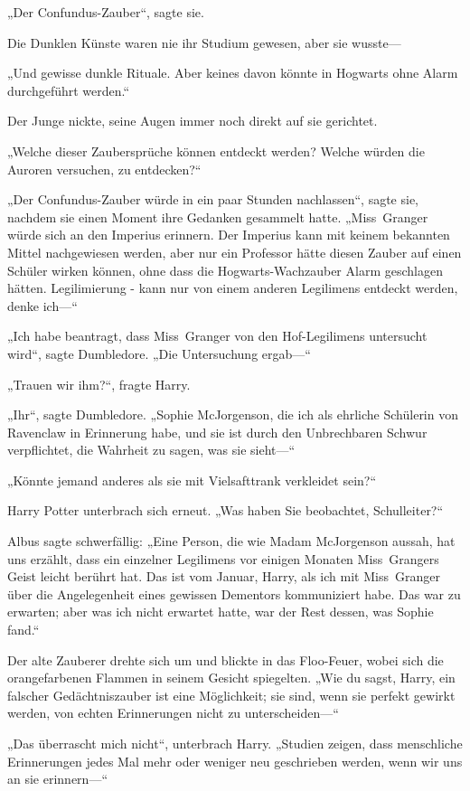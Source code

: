 {„Der Confundus-Zauber“, sagte sie.

Die Dunklen Künste waren nie ihr Studium gewesen, aber sie wusste—

„Und gewisse dunkle Rituale. Aber keines davon könnte in Hogwarts ohne Alarm durchgeführt werden.“

Der Junge nickte, seine Augen immer noch direkt auf sie gerichtet.

„Welche dieser Zaubersprüche können entdeckt werden? Welche würden die Auroren versuchen, zu entdecken?“

„Der Confundus-Zauber würde in ein paar Stunden nachlassen“, sagte sie, nachdem sie einen Moment ihre Gedanken gesammelt hatte. „Miss~Granger würde sich an den Imperius erinnern. Der Imperius kann mit keinem bekannten Mittel nachgewiesen werden, aber nur ein Professor hätte diesen Zauber auf einen Schüler wirken können, ohne dass die Hogwarts-Wachzauber Alarm geschlagen hätten. Legilimierung - kann nur von einem anderen Legilimens entdeckt werden, denke ich—“

„Ich habe beantragt, dass Miss~Granger von den Hof-Legilimens untersucht wird“, sagte Dumbledore. „Die Untersuchung ergab—“

„Trauen wir ihm?“, fragte Harry.

„Ihr“, sagte Dumbledore. „Sophie McJorgenson, die ich als ehrliche Schülerin von Ravenclaw in Erinnerung habe, und sie ist durch den Unbrechbaren Schwur verpflichtet, die Wahrheit zu sagen, was sie sieht—“

„Könnte jemand anderes als sie mit Vielsafttrank verkleidet sein?“

Harry Potter unterbrach sich erneut. „Was haben Sie beobachtet, Schulleiter?“

Albus sagte schwerfällig: „Eine Person, die wie Madam McJorgenson aussah, hat uns erzählt, dass ein einzelner Legilimens vor einigen Monaten Miss~Grangers Geist leicht berührt hat. Das ist vom Januar, Harry, als ich mit Miss~Granger über die Angelegenheit eines gewissen Dementors kommuniziert habe. Das war zu erwarten; aber was ich nicht erwartet hatte, war der Rest dessen, was Sophie fand.“

Der alte Zauberer drehte sich um und blickte in das Floo-Feuer, wobei sich die orangefarbenen Flammen in seinem Gesicht spiegelten. „Wie du sagst, Harry, ein falscher Gedächtniszauber ist eine Möglichkeit; sie sind, wenn sie perfekt gewirkt werden, von echten Erinnerungen nicht zu unterscheiden—“

„Das überrascht mich nicht“, unterbrach Harry. „Studien zeigen, dass menschliche Erinnerungen jedes Mal mehr oder weniger neu geschrieben werden, wenn wir uns an sie erinnern—“

}
